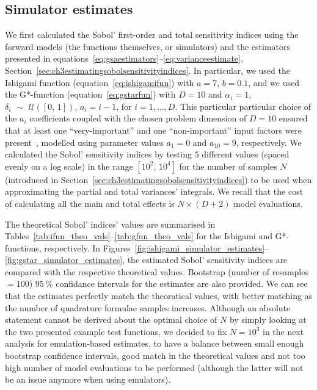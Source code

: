 \subsection{Simulator estimates}\label{sec:chAsimulator_estimates}
We first calculated the Sobol' first-order and total sensitivity indices using the forward models (the functions themselves, or simulators) and the estimators presented in equations~\eqref{eq:gsaestimators}--\eqref{eq:varianceestimate}, Section~\ref{sec:ch3estimatingsobolsensitivityindices}. In particular, we used the Ishigami function (equation~\eqref{eq:ishigamifun}) with $a=7,\,b=0.1$, and we used the G*-function (equation~\eqref{eq:gstarfun}) with $D=10$ and $\alpha_i=1$, $\delta_i\,\,\sim\,\,\mathcal{U}([0,\,1])$, $a_i=i-1$, for $i=1,\dots,D$. This particular particular choice of the $a_i$ coefficients coupled with the chosen problem dimension of $D=10$ ensured that at least one ``very-important'' and one ``non-important'' input factors were present~\cite{Saltelli:2010,Marrel:2008}, modelled using parameter values $a_1=0$ and $a_{10}=9$, respectively. We calculated the Sobol' sensitivity indices by testing $5$ different values (spaced evenly on a log scale) in the range $[10^2,\,10^4]$ for the number of samples $N$ (introduced in Section~\ref{sec:ch3estimatingsobolsensitivityindices}) to be used when approximating the partial and total variances' integrals. We recall that the cost of calculating all the main and total effects is $N\times(D+2)$ model evaluations.

\vspace{0.2cm}
The theoretical Sobol' indices' values are summarised in Tables~\ref{tab:ifun_theo_vals}--\ref{tab:gfun_theo_vals} for the Ishigami and G*- functions, respectively. In Figures~\ref{fig:ishigami_simulator_estimates}--\ref{fig:gstar_simulator_estimates}, the estimated Sobol' sensitivity indices are compared with the respective theoretical values. Bootstrap (number of resamples $=100$) $\SI{95}{\percent}$ confidance intervals for the estimates are also provided. We can see that the estimates perfectly match the theoratical values, with better matching as the number of quadrature formulae samples increases. Although an absolute statement cannot be derived about the optimal choice of $N$ by simply looking at the two presented example test functions, we decided to fix $N=10^3$ in the next analysis for emulation-based estimates, to have a balance between small enough bootstrap confidence intervals, good match in the theoretical values and not too high number of model evaluations to be performed (although the latter will not be an issue anymore when using emulators).

